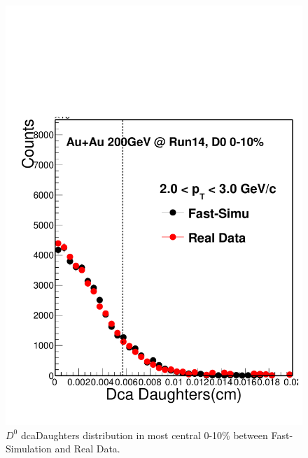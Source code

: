 \begin{figure}[htbp]
\begin{minipage}[htbp]{0.52\linewidth}
\centering
\includegraphics[width=1.0\textwidth,angle=0]{figure/Run14_D0HFT/dcaDaughters.pdf}
\caption{ $D^0$ dcaDaughters distribution in most central 0-10\% between Fast-Simulation and Real Data.\label{dcaDaughters}}
\end{minipage}
\hfill
\begin{minipage}[htbp]{0.52\linewidth}
\centering

\end{minipage}
\end{figure}
